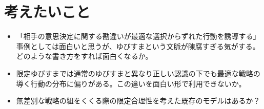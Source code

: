 \documentclass{jsarticle}
\begin{document}
\section{考えたいこと}
\begin{itemize}
	\item 「相手の意思決定に関する勘違いが最適な選択からずれた行動を誘導する」事例としては面白いと思うが、ゆびすまという文脈が陳腐すぎる気がする。どのような書き方をすれば面白くなるか。
	\item 限定ゆびすまでは通常のゆびすまと異なり正しい認識の下でも最適な戦略の導く行動の分布に偏りがある。この違いを面白い形で利用できないか。
	\item 無差別な戦略の組をくくる際の限定合理性を考えた既存のモデルはあるか？
\end{itemize}
\end{document}
